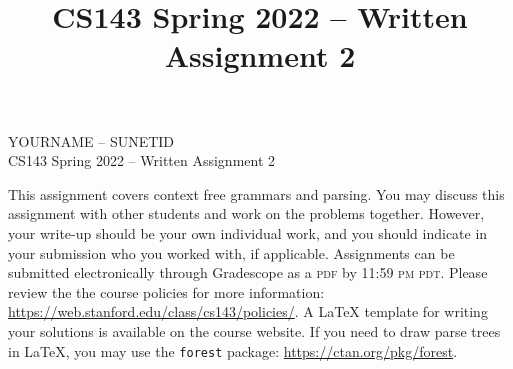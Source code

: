 \documentclass[11pt]{article}
\title{CS143 Spring 2022 -- Written Assignment 2}
\begin{document}
\begin{center}
\LARGE YOURNAME -- SUNETID \\
\LARGE CS143 Spring 2022 -- Written Assignment 2 \\
\end{center}

This assignment covers context free grammars and parsing. You may discuss this assignment with other students and work on the problems together. However, your write-up should be your own individual work, and you should indicate in your submission who you worked with, if applicable. Assignments can be submitted electronically through Gradescope as a \textsc{pdf} by 11:59 \textsc{pm pdt}. Please review the the course policies for more information: \url{https://web.stanford.edu/class/cs143/policies/}. A \LaTeX{} template for writing your solutions is available on the course website.
If you need to draw parse trees in \LaTeX{}, you may use the {\tt forest} package: \url{https://ctan.org/pkg/forest}.

\bigskip
\end{document}
